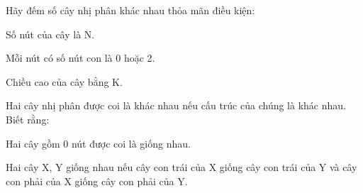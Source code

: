 Hãy đếm số cây nhị phân khác nhau thỏa mãn điều kiện:  

   Số nút của cây là N.  

   Mỗi nút có số nút con là 0 hoặc 2.  

   Chiều cao của cây bằng K.  

   Hai cây nhị phân được coi là khác nhau nếu cấu trúc của chúng là khác nhau. Biết rằng:  

   Hai cây gồm 0 nút được coi là giống nhau.  

   Hai cây X, Y giống nhau nếu cây con trái của X giống cây con trái của Y và cây con phải của X giống cây con phải của Y.